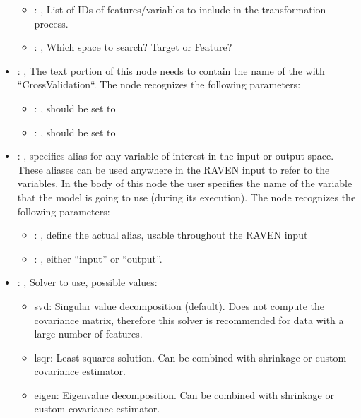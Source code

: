 \begin{itemize}
\begin{itemize}
        \item {}: , 
          List of IDs of features/variables to include in the transformation process.

        \item {}: , 
          Which space to search? Target or Feature?
      \end{itemize}

    \item {}: , 
      The text portion of this node needs to contain the name of the  with
               ``CrossValidation``.
      The  node recognizes the following parameters:
        \begin{itemize}
          \item {}: , 
            should be set to 
          \item {}: , 
            should be set to 
      \end{itemize}

    \item {}: , 
      specifies alias for         any variable of interest in the input or output space. These
      aliases can be used anywhere in the RAVEN input to         refer to the variables. In the body
      of this node the user specifies the name of the variable that the model is going to use
      (during its execution).
      The  node recognizes the following parameters:
        \begin{itemize}
          \item {}: , 
            define the actual alias, usable throughout the RAVEN input
          \item {}: , 
            either ``input'' or ``output''.
      \end{itemize}

    \item {}: , 
      Solver to use, possible values:
      \begin{itemize}                                                    \item svd: Singular value
      decomposition (default). Does not compute the covariance matrix,
      therefore this solver is recommended for data with a large number of features.
      \item lsqr: Least squares solution. Can be combined with shrinkage or custom covariance
      estimator.                                                    \item eigen: Eigenvalue
      decomposition. Can be combined with shrinkage or custom covariance estimator.
      \end{itemize}


\end{itemize}
